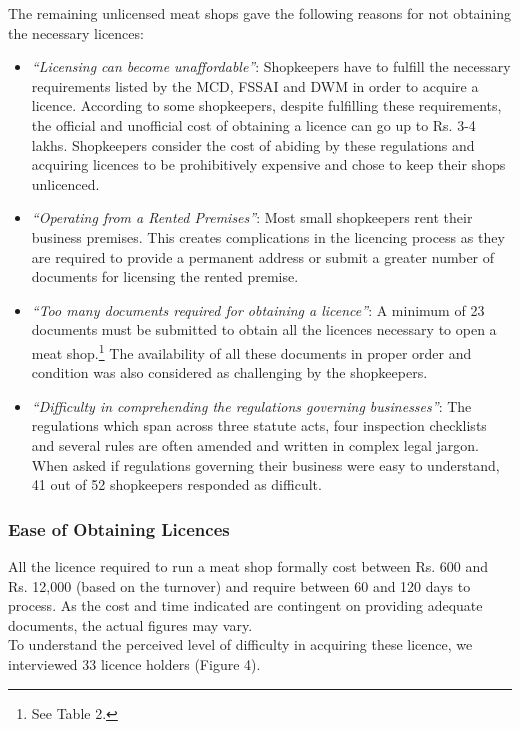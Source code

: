 \documentclass[a4paper, 12pt]{article}
\begin{document}
The remaining unlicensed meat shops gave the following reasons for not obtaining the necessary licences:

\begin{itemize}
\item \textit{“Licensing can become unaffordable”}: Shopkeepers have to fulfill the necessary requirements listed by the MCD, FSSAI and DWM in order to acquire a licence. According to some shopkeepers, despite fulfilling these requirements, the official and unofficial cost of obtaining a licence can go up to Rs. 3-4 lakhs. Shopkeepers consider the cost of abiding by these regulations and acquiring licences to be prohibitively expensive and chose to keep their shops unlicenced.
\item \textit{“Operating from a Rented Premises”}: Most small shopkeepers rent their business premises. This creates complications in the licencing process as they are required to provide a permanent address or submit a greater number of documents for licensing the rented premise. 
\item \textit{“Too many documents required for obtaining a licence”}: A minimum of 23 documents must be submitted to obtain all the licences necessary to open a meat shop.\footnote{ See Table 2.} The availability of all these documents in proper order and condition was also considered as challenging by the shopkeepers.
\item \textit{“Difficulty in comprehending the regulations governing businesses”}: The regulations which span across three statute acts, four inspection checklists and several rules are often amended and written in complex legal jargon. When asked if regulations governing their business were easy to understand, 41 out of 52 shopkeepers responded as difficult.
\end{itemize}

\subsubsection{Ease of Obtaining Licences}

All the licence required to run a meat shop formally cost between Rs. 600 and Rs. 12,000 (based on the turnover) and require between 60 and 120 days to process. As the cost and time indicated are contingent on providing adequate documents, the actual figures may vary. \\

To understand the perceived level of difficulty in acquiring these licence, we interviewed 33 licence holders (Figure 4).\\
\end{document}
